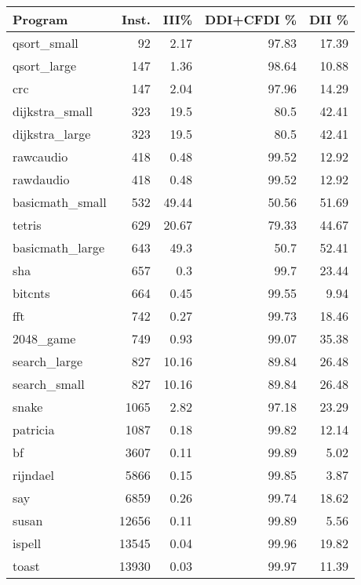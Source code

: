 \begin{tabular}{lrrrr}
\hline
 Program         &   Inst. &   III\% &   DDI+CFDI \% &   DII \% \\
\hline
 qsort\_small     &      92 &   2.17 &        97.83 &   17.39 \\
 qsort\_large     &     147 &   1.36 &        98.64 &   10.88 \\
 crc             &     147 &   2.04 &        97.96 &   14.29 \\
 dijkstra\_small  &     323 &  19.5  &        80.5  &   42.41 \\
 dijkstra\_large  &     323 &  19.5  &        80.5  &   42.41 \\
 rawcaudio       &     418 &   0.48 &        99.52 &   12.92 \\
 rawdaudio       &     418 &   0.48 &        99.52 &   12.92 \\
 basicmath\_small &     532 &  49.44 &        50.56 &   51.69 \\
 tetris          &     629 &  20.67 &        79.33 &   44.67 \\
 basicmath\_large &     643 &  49.3  &        50.7  &   52.41 \\
 sha             &     657 &   0.3  &        99.7  &   23.44 \\
 bitcnts         &     664 &   0.45 &        99.55 &    9.94 \\
 fft             &     742 &   0.27 &        99.73 &   18.46 \\
 2048\_game       &     749 &   0.93 &        99.07 &   35.38 \\
 search\_large    &     827 &  10.16 &        89.84 &   26.48 \\
 search\_small    &     827 &  10.16 &        89.84 &   26.48 \\
 snake           &    1065 &   2.82 &        97.18 &   23.29 \\
 patricia        &    1087 &   0.18 &        99.82 &   12.14 \\
 bf              &    3607 &   0.11 &        99.89 &    5.02 \\
 rijndael        &    5866 &   0.15 &        99.85 &    3.87 \\
 say             &    6859 &   0.26 &        99.74 &   18.62 \\
 susan           &   12656 &   0.11 &        99.89 &    5.56 \\
 ispell          &   13545 &   0.04 &        99.96 &   19.82 \\
 toast           &   13930 &   0.03 &        99.97 &   11.39 \\

\end{tabular}
